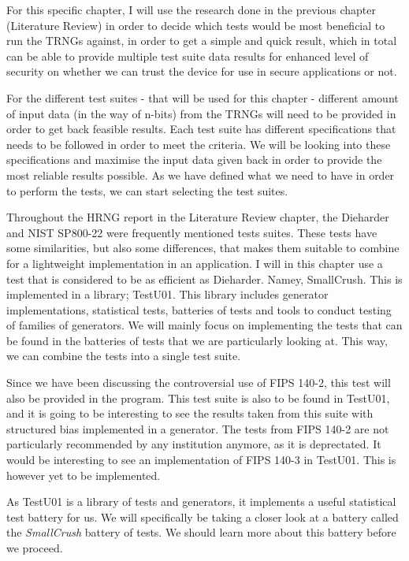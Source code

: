 \documentclass[]{final_report}
\begin{document}
\par{For this specific chapter, I will use the research done in the previous chapter (Literature Review) in order to decide which tests would be most beneficial to run the TRNGs against, in order to get a simple and quick result, which in total can be able to provide multiple test suite data results for enhanced level of security on whether we can trust the device for use in secure applications or not.}

\par{For the different test suites - that will be used for this chapter - different amount of input data (in the way of n-bits) from the TRNGs will need to be provided in order to get back feasible results. Each test suite has different specifications that needs to be followed in order to meet the criteria. We will be looking into these specifications and maximise the input data given back in order to provide the most reliable results possible. As we have defined what we need to have in order to perform the tests, we can start selecting the test suites.}

\par{Throughout the HRNG report in the Literature Review chapter, the Dieharder and NIST SP800-22 were frequently mentioned tests suites. These tests have some similarities, but also some differences, that makes them suitable to combine for a lightweight implementation in an application. I will in this chapter use a test that is considered to be as efficient as Dieharder. Namey, SmallCrush. This is implemented in a library; TestU01. This library includes generator implementations, statistical tests, batteries of tests and tools to conduct testing of families of generators. We will mainly focus on implementing the tests that can be found in the batteries of tests that we are particularly looking at. This way, we can combine the tests into a single test suite.}

\par{Since we have been discussing the controversial use of FIPS 140-2, this test will also be provided in the program. This test suite is also to be found in TestU01, and it is going to be interesting to see the results taken from this suite with structured bias implemented in a generator. The tests from FIPS 140-2 are not particularly recommended by any institution anymore, as it is deprectated. It would be interesting to see an implementation of FIPS 140-3 in TestU01. This is however yet to be implemented.}

\par{As TestU01 is a library of tests and generators\cite{Ecuyer:2013}, it implements a useful statistical test battery for us. We will specifically be taking a closer look at a battery called the \textit{SmallCrush} battery of tests. We should learn more about this battery before we proceed.}
\end{document}
